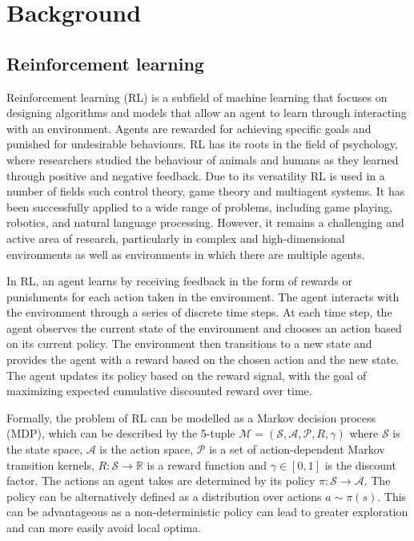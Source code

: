 \chapter{Background}

\section{Reinforcement learning}
\label{sec:RL}
Reinforcement learning (RL) is a subfield of machine learning that focuses on designing algorithms and models that allow an agent to learn through interacting with an environment. Agents are rewarded for achieving specific goals and punished for undesirable behaviours. RL has its roots in the field of psychology, where researchers studied the behaviour of animals and humans as they learned through positive and negative feedback. Due to its versatility RL is used in a number of fields such control theory, game theory and multiagent systems. It has been successfully applied to a wide range of problems, including game playing, robotics, and natural language processing. However, it remains a challenging and active area of research, particularly in complex and high-dimensional environments as well as environments in which there are multiple agents. 

In RL, an agent learns by receiving feedback in the form of rewards or punishments for each action taken in the environment. The agent interacts with the environment through a series of discrete time steps. At each time step, the agent observes the current state of the environment and chooses an action based on its current policy. The environment then transitions to a new state and provides the agent with a reward based on the chosen action and the new state. The agent updates its policy based on the reward signal, with the goal of maximizing expected cumulative discounted reward over time.

Formally, the problem of RL can be modelled as a Markov decision process (MDP), which can be described by the 5-tuple $\mathcal{M} = (\mathcal{S}, \mathcal{A}, \mathcal{P}, R,\gamma)$ where $\mathcal{S}$ is the state space, $\mathcal{A}$ is the action space, $\mathcal{P}$ is a set of action-dependent Markov transition kernels, $R: \mathcal{S} \rightarrow \mathbb{R}$ is a reward function and $\gamma \in [0,1]$ is the discount factor.
The actions an agent takes are determined by its policy $\pi: \mathcal{S} \rightarrow \mathcal{A}$. The policy can be alternatively defined as a distribution over actions $a \sim \pi(s)$. This can be advantageous as a non-deterministic policy can lead to greater exploration and can more easily avoid local optima. 

